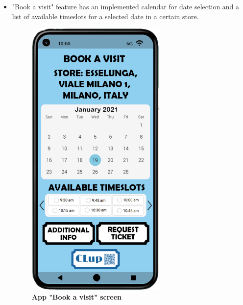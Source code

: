 \begin{itemize}
\item "Book a visit" feature has an implemented calendar for date selection and a list of available timeslots for a selected date in a certain store.
\begin{figure}[!htb]
\centering
\includegraphics[width=0.65\textwidth]{Images/App/Android_BookAVisit}
\caption{\label{fig:androidbav}\textbf{App "Book a visit" screen}}
\end{figure}
\end{itemize}
\newpage



